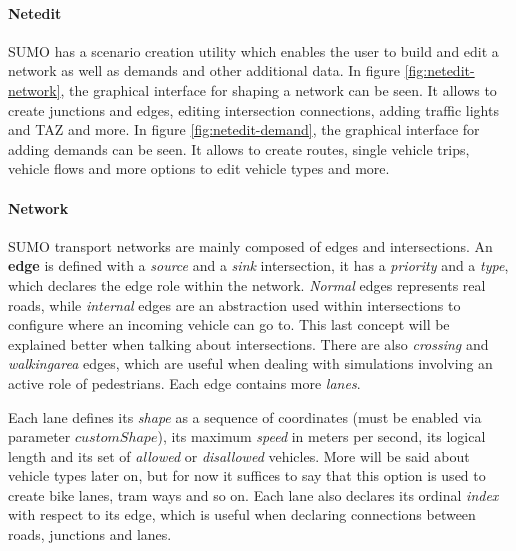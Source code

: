\paragraph{Netedit}

SUMO has a scenario creation utility which enables the user to build and edit a network as well as demands and other additional data.
In figure \ref{fig:netedit-network}, the graphical interface for shaping a network can be seen. It allows to create junctions and edges, editing intersection connections, adding traffic lights and TAZ and more.
In figure \ref{fig:netedit-demand}, the graphical interface for adding demands can be seen. It allows to create routes, single vehicle trips, vehicle flows and more options to edit vehicle types and more.


\paragraph{Network}

SUMO transport networks are mainly composed of edges and intersections. An \textbf{edge} is defined with a \textit{source} and a \textit{sink} intersection, it has a \textit{priority} and a \textit{type}, which declares the edge role within the network. \textit{Normal} edges represents real roads, while \textit{internal} edges are an abstraction used within intersections to configure where an incoming vehicle can go to. This last concept will be explained better when talking about intersections. There are also \textit{crossing} and \textit{walkingarea} edges, which are useful when dealing with simulations involving an active role of pedestrians. Each edge contains more \textit{lanes}.

Each lane defines its \textit{shape} as a sequence of coordinates (must be enabled via parameter $customShape$), its maximum \textit{speed} in meters per second, its logical length and its set of \textit{allowed} or \textit{disallowed} vehicles. More will be said about vehicle types later on, but for now it suffices to say that this option is used to create bike lanes, tram ways and so on. Each lane also declares its ordinal \textit{index} with respect to its edge, which is useful when declaring connections between roads, junctions and lanes.

